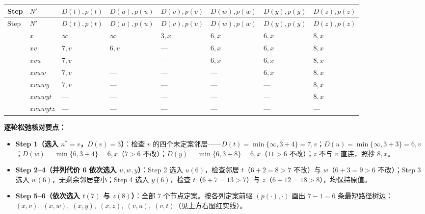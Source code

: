 \begingroup\small\setlength{\tabcolsep}{3pt}\renewcommand{\arraystretch}{1.20}
\begin{longtable}{@{}>{\raggedright\arraybackslash}p{}>{\raggedright\arraybackslash}p{}>{\raggedright\arraybackslash}p{}>{\raggedright\arraybackslash}p{}>{\raggedright\arraybackslash}p{}>{\raggedright\arraybackslash}p{}>{\raggedright\arraybackslash}p{}>{\raggedright\arraybackslash}p{}@{}}
\toprule
Step & $N'$ & $D(t),p(t)$ & $D(u),p(u)$ & $D(v),p(v)$ & $D(w),p(w)$ & $D(y),p(y)$ & $D(z),p(z)$ \\
\midrule\endfirsthead
Step & $N'$ & $D(t),p(t)$ & $D(u),p(u)$ & $D(v),p(v)$ & $D(w),p(w)$ & $D(y),p(y)$ & $D(z),p(z)$ \\
\midrule\endhead
\bottomrule\endfoot
0 & $x$ & $\infty$ & $\infty$ & \textbf{$3, x$} & $6, x$ & $6, x$ & $8, x$ \\
1 & $xv$ & $7, v$ & \textbf{$6, v$} & — & $6, x$ & $6, x$ & $8, x$ \\
2 & $xvu$ & $7, v$ & — & — & \textbf{$6, x$} & $6, x$ & $8, x$ \\
3 & $xvuw$ & $7, v$ & — & — & — & \textbf{$6, x$} & $8, x$ \\
4 & $xvuwy$ & \textbf{$7, v$} & — & — & — & — & $8, x$ \\
5 & $xvuwyt$ & — & — & — & — & — & \textbf{$8, x$} \\
6 & $xvuwytz$ & — & — & — & — & — & — \\
\end{longtable}\endgroup

\textbf{逐轮松弛核对要点：}
\begin{itemize}
\item \textbf{Step 1（选入 $n^* = v$，$D(v)=3$）}：检查 $v$ 的四个未定案邻居——$D(t)=\min\{\infty, 3+4\}=7,v$；$D(u)=\min\{\infty, 3+3\}=6,v$；$D(w)=\min\{6, 3+4\}=6,x$（$7>6$ 不改）；$D(y)=\min\{6, 3+8\}=6,x$（$11>6$ 不改）；$z$ 不与 $v$ 直连，照抄 $8,x$。
\item \textbf{Step 2–4（并列代价 6 依次选入 $u, w, y$）}：Step 2 选入 $u(6)$，检查邻居 $t$（$6+2=8 > 7$ 不改）与 $w$（$6+3=9 > 6$ 不改）；Step 3 选入 $w(6)$，无剩余邻居变小；Step 4 选入 $y(6)$，检查 $t$（$6+7=13 > 7$）与 $z$（$6+12=18 > 8$），均保持原值。
\item \textbf{Step 5–6（依次选入 $t(7)$ 与 $z(8)$）}：全部 7 个节点定案。按各列定案前驱 $(p(\cdot), \cdot)$ 画出 $7-1 = 6$ 条最短路径树边：\textbf{$(x, v),\; (x, w),\; (x, y),\; (x, z),\; (v, u),\; (v, t)$}（见上方右图红实线）。
\end{itemize}

